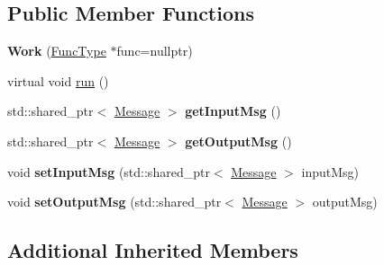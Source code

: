 \subsection*{Public Member Functions}
\begin{DoxyCompactItemize}
\item 
\hypertarget{classcom_1_1ygomi_1_1roaddb_1_1util_1_1Work_acee5d8a147fc89e9adf6c640580a3580}{{\bfseries Work} (\hyperlink{classcom_1_1ygomi_1_1roaddb_1_1util_1_1Runnable_adc4334b0387442cd2484c3a341ae7fbc}{Func\-Type} $\ast$func=nullptr)}\label{classcom_1_1ygomi_1_1roaddb_1_1util_1_1Work_acee5d8a147fc89e9adf6c640580a3580}

\item 
virtual void \hyperlink{classcom_1_1ygomi_1_1roaddb_1_1util_1_1Work_abc92ca2d3f0b7c7f82ebcb4df0d51d0e}{run} ()
\item 
\hypertarget{classcom_1_1ygomi_1_1roaddb_1_1util_1_1Work_af33ed777921f156941b150a64e4f6d94}{std\-::shared\-\_\-ptr$<$ \hyperlink{classcom_1_1ygomi_1_1roaddb_1_1util_1_1Message}{Message} $>$ {\bfseries get\-Input\-Msg} ()}\label{classcom_1_1ygomi_1_1roaddb_1_1util_1_1Work_af33ed777921f156941b150a64e4f6d94}

\item 
\hypertarget{classcom_1_1ygomi_1_1roaddb_1_1util_1_1Work_a6b8aff938d51ca3619efc1f92b6725d0}{std\-::shared\-\_\-ptr$<$ \hyperlink{classcom_1_1ygomi_1_1roaddb_1_1util_1_1Message}{Message} $>$ {\bfseries get\-Output\-Msg} ()}\label{classcom_1_1ygomi_1_1roaddb_1_1util_1_1Work_a6b8aff938d51ca3619efc1f92b6725d0}

\item 
\hypertarget{classcom_1_1ygomi_1_1roaddb_1_1util_1_1Work_a5b0bf836c6a4048bdb24f6f55b7b10bc}{void {\bfseries set\-Input\-Msg} (std\-::shared\-\_\-ptr$<$ \hyperlink{classcom_1_1ygomi_1_1roaddb_1_1util_1_1Message}{Message} $>$ input\-Msg)}\label{classcom_1_1ygomi_1_1roaddb_1_1util_1_1Work_a5b0bf836c6a4048bdb24f6f55b7b10bc}

\item 
\hypertarget{classcom_1_1ygomi_1_1roaddb_1_1util_1_1Work_aaf99d410083eab55ce6872ece28c1678}{void {\bfseries set\-Output\-Msg} (std\-::shared\-\_\-ptr$<$ \hyperlink{classcom_1_1ygomi_1_1roaddb_1_1util_1_1Message}{Message} $>$ output\-Msg)}\label{classcom_1_1ygomi_1_1roaddb_1_1util_1_1Work_aaf99d410083eab55ce6872ece28c1678}

\end{DoxyCompactItemize}
\subsection*{Additional Inherited Members}


